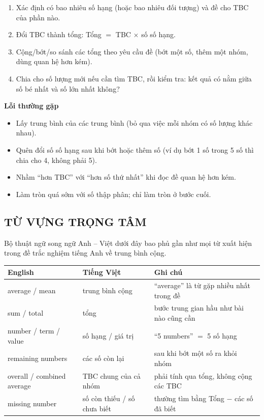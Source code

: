 \documentclass[../main.tex]{subfiles}
\begin{document}
\begin{enumerate}
    \item Xác định có bao nhiêu số hạng (hoặc bao nhiêu đối tượng) và đề cho TBC của phần nào.
    \item Đổi TBC thành tổng: Tổng $=$ TBC $\times$ số số hạng.
    \item Cộng/bớt/so sánh các tổng theo yêu cầu đề (bớt một số, thêm một nhóm, dùng quan hệ hơn kém).
    \item Chia cho số lượng mới nếu cần tìm TBC, rồi kiểm tra: kết quả có nằm giữa số bé nhất và số lớn nhất không?
\end{enumerate}

\begin{luuy}
    \textbf{Lỗi thường gặp}
    \begin{itemize}
        \item Lấy trung bình của các trung bình (bỏ qua việc mỗi nhóm có số lượng khác nhau).
        \item Quên đổi số số hạng sau khi bớt hoặc thêm số (ví dụ bớt 1 số trong 5 số thì chia cho 4, không phải 5).
        \item Nhầm ``hơn TBC'' với ``hơn số thứ nhất'' khi đọc đề quan hệ hơn kém.
        \item Làm tròn quá sớm với số thập phân; chỉ làm tròn ở bước cuối.
    \end{itemize}
\end{luuy}

\subsection{TỪ VỰNG TRỌNG TÂM}
Bộ thuật ngữ song ngữ Anh -- Việt dưới đây bao phủ gần như mọi từ xuất hiện trong đề trắc nghiệm tiếng Anh về trung bình cộng.

\begin{center}
\begin{tabular}{|S{4.6cm}|S{4cm}|S{6.6cm}|}
    \hline
    \textbf{English} & \textbf{Tiếng Việt} & \textbf{Ghi chú} \\
    \hline
    average / mean & trung bình cộng & ``average'' là từ gặp nhiều nhất trong đề \\
    \hline
    sum / total & tổng & bước trung gian hầu như bài nào cũng cần \\
    \hline
    number / term / value & số hạng / giá trị & ``5 numbers'' $=$ 5 số hạng \\
    \hline
    remaining numbers & các số còn lại & sau khi bớt một số ra khỏi nhóm \\
    \hline
    overall / combined average & TBC chung của cả nhóm & phải tính qua tổng, không cộng các TBC \\
    \hline
    missing number & số còn thiếu / số chưa biết & thường tìm bằng Tổng $-$ các số đã biết \\
    \hline
\end{tabular}
\end{center}
\end{document}
